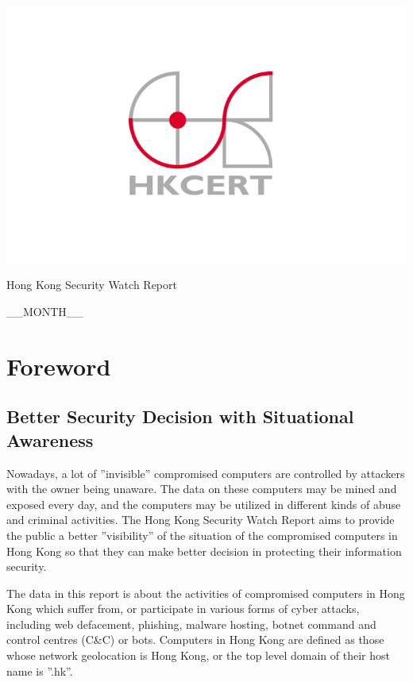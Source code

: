 \documentclass[11pt]{article}
\begin{document}
\vspace{1cm}

\includegraphics{HKCERT}

\vspace{4cm}

\centerline{\Huge Hong Kong Security Watch Report}

\vspace{2.5cm}

\centerline{\huge __MONTH__}
\newpage

\section*{Foreword}
\subsection*{Better Security Decision with Situational Awareness}

Nowadays, a lot of ''invisible'' compromised computers are controlled by attackers with the owner being unaware. The data on these computers may be mined and exposed every day, and the computers may be utilized in different kinds of abuse and criminal activities.
The Hong Kong Security Watch Report aims to provide the public a better ''visibility'' of the situation of the compromised computers in Hong Kong so that they can make better decision in protecting their information security.

The data in this report is about the activities of compromised computers in Hong Kong which suffer from, or participate in various forms of cyber attacks, including web defacement, phishing, malware hosting, botnet command and control centres (C\&C) or bots. Computers in Hong Kong are defined as those whose network geolocation is Hong Kong, or the top level domain of their host name is ''.hk''.
\end{document}
